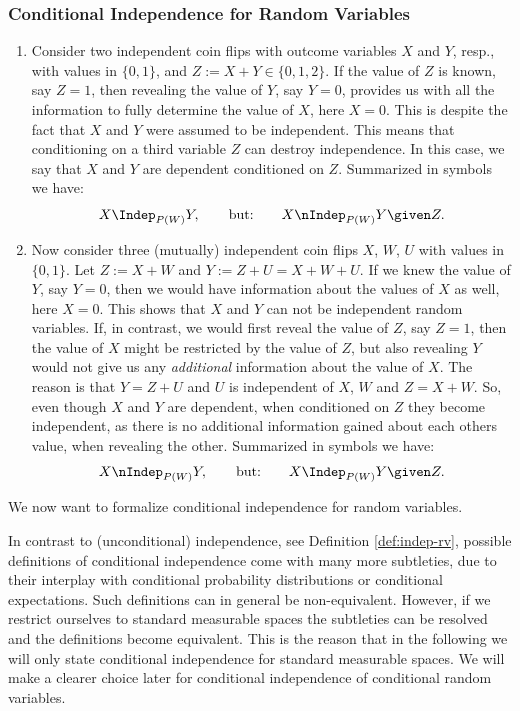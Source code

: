 \subsubsection{Conditional Independence for Random Variables}


\begin{Motivation}
    \begin{enumerate}
        \item Consider two independent coin flips with outcome variables $X$ and $Y$, resp., with values in $\{0,1\}$, and
    $Z:=X + Y \in \{0,1,2 \}$. If the value of $Z$ is known, say $Z=1$, then revealing the value of $Y$, say $Y=0$, provides us with all the information to fully determine the value of $X$, here $X=0$. This is despite the fact that $X$ and $Y$ were assumed to be independent. This means that conditioning on a third variable $Z$ can destroy independence. In this case, we say that $X$ and $Y$ are dependent conditioned on $Z$. Summarized in symbols we have:
    \[ X \Indep_{P(W)} Y, \qquad \text{but:} \qquad X \nIndep_{P(W)} Y \given Z.\]
\item Now consider three (mutually) independent coin flips $X$, $W$, $U$ with values in $\{0,1\}$.
    Let $Z:=X +W $ and $Y:=Z+U = X + W + U$. If we knew the value of $Y$, say $Y=0$, then we would have information about the values of $X$ as well, here $X=0$. This shows that $X$ and $Y$ can not be independent random variables.
    If, in contrast, we would first reveal the value of $Z$, say $Z=1$, then the value of $X$ might be restricted by the value of $Z$, but also revealing $Y$ would not give us any \emph{additional} information about the value of $X$. The reason is that $Y = Z + U$ and $U$ is independent of $X$, $W$ and $Z=X+W$. So, even though $X$ and $Y$ are dependent, when conditioned on $Z$ they become independent, as there is no additional information gained about each others value, when revealing the other. Summarized in symbols we have:
        \[ X \nIndep_{P(W)} Y, \qquad \text{but:} \qquad X \Indep_{P(W)} Y \given Z.\]
    \end{enumerate}
    We now want to formalize conditional independence for random variables.
\end{Motivation}

\begin{Rem}
    In contrast to (unconditional) independence, see Definition \ref{def:indep-rv}, possible definitions of conditional independence come with many more subtleties, due to their interplay with conditional probability distributions or conditional expectations. Such definitions can in general be non-equivalent. However, if we restrict ourselves to standard measurable spaces the subtleties can be resolved and the definitions become equivalent. 
    This is the reason that in the following we will only state conditional independence for standard measurable spaces.
    We will make a clearer choice later for conditional independence of conditional random variables.
\end{Rem}

